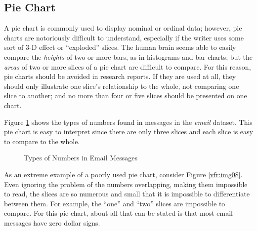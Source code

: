\subsection{Pie Chart} A pie chart is commonly used to display nominal or ordinal data; however, pie charts are notoriously difficult to understand, especially if the writer uses some sort of $ 3 $-D effect or ``exploded'' slices. The human brain seems able to easily compare the \textit{heights} of two or more bars, as in histograms and bar charts, but the \textit{areas} of two or more slices of a pie chart are difficult to compare. For this reason, pie charts should be avoided in research reports. If they are used at all, they should only illustrate one slice's relationship to the whole, not comparing one slice to another; and no more than four or five slices should be presented on one chart.

Figure \ref{vfr:img07} shows the types of numbers found in messages in the \textit{email} dataset. This pie chart is easy to interpret since there are only three slices and each slice is easy to compare to the whole.

\begin{figure}[H]
  \begin{center}
    \caption{Types of Numbers in Email Messages}
    \label{vfr:img07}
  \end{center}
\end{figure}

As an extreme example of a poorly used pie chart, consider Figure \ref{vfr:img08}. Even ignoring the problem of the numbers overlapping, making them impossible to read, the slices are so numerous and small that it is impossible to differentiate between them. For example, the ``one'' and ``two'' slices are impossible to compare. For this pie chart, about all that can be stated is that most email messages have zero dollar signs.

